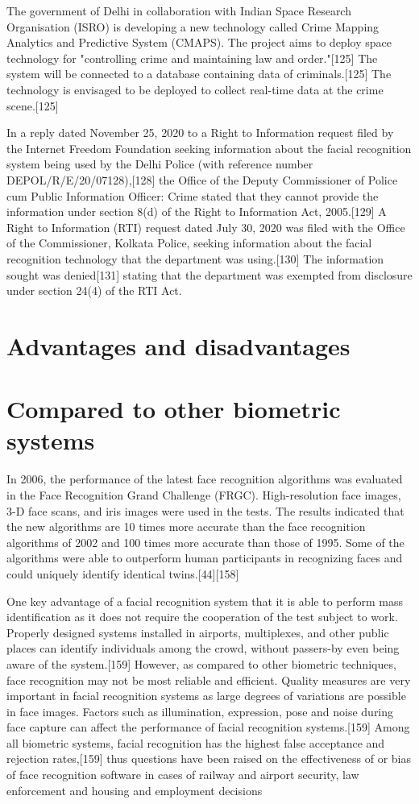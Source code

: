 The government of Delhi in collaboration with Indian Space Research Organisation (ISRO) is developing a new technology called Crime Mapping Analytics and Predictive System (CMAPS). The project aims to deploy space technology for "controlling crime and maintaining law and order."[125] The system will be connected to a database containing data of criminals.[125] The technology is envisaged to be deployed to collect real-time data at the crime scene.[125]

In a reply dated November 25, 2020 to a Right to Information request filed by the Internet Freedom Foundation seeking information about the facial recognition system being used by the Delhi Police (with reference number DEPOL/R/E/20/07128),[128] the Office of the Deputy Commissioner of Police cum Public Information Officer: Crime stated that they cannot provide the information under section 8(d) of the Right to Information Act, 2005.[129] A Right to Information (RTI) request dated July 30, 2020 was filed with the Office of the Commissioner, Kolkata Police, seeking information about the facial recognition technology that the department was using.[130] The information sought was denied[131] stating that the department was exempted from disclosure under section 24(4) of the RTI Act.
\newpage
\section{Advantages and disadvantages}
\section{Compared to other biometric systems}
In 2006, the performance of the latest face recognition algorithms was evaluated in the Face Recognition Grand Challenge (FRGC). High-resolution face images, 3-D face scans, and iris images were used in the tests. The results indicated that the new algorithms are 10 times more accurate than the face recognition algorithms of 2002 and 100 times more accurate than those of 1995. Some of the algorithms were able to outperform human participants in recognizing faces and could uniquely identify identical twins.[44][158]

One key advantage of a facial recognition system that it is able to perform mass identification as it does not require the cooperation of the test subject to work. Properly designed systems installed in airports, multiplexes, and other public places can identify individuals among the crowd, without passers-by even being aware of the system.[159] However, as compared to other biometric techniques, face recognition may not be most reliable and efficient. Quality measures are very important in facial recognition systems as large degrees of variations are possible in face images. Factors such as illumination, expression, pose and noise during face capture can affect the performance of facial recognition systems.[159] Among all biometric systems, facial recognition has the highest false acceptance and rejection rates,[159] thus questions have been raised on the effectiveness of or bias of face recognition software in cases of railway and airport security, law enforcement and housing and employment decisions
\newpage

